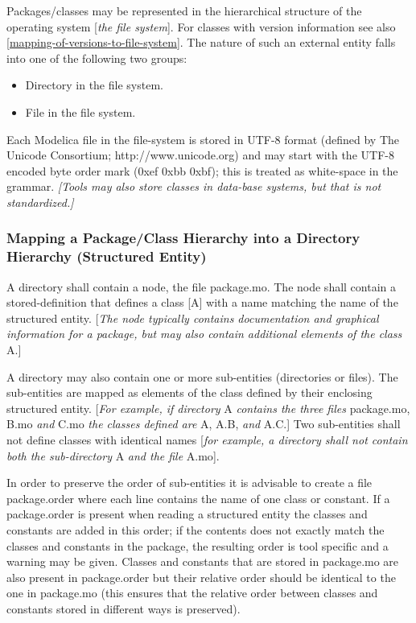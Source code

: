 \documentclass[10pt,a4paper]{report}
\def\doublelabel#1{\label{#1}\hypertarget{#1}{}}
\begin{document}
Packages/classes may be represented in the hierarchical structure of the
operating system {[}\emph{the file system}{]}. For classes with version
information see also \ref{mapping-of-versions-to-file-system}. The nature of such an external
entity falls into one of the following two groups:

\begin{itemize}
\item
  Directory in the file system.
\end{itemize}

\begin{itemize}
\item
  File in the file system.
\end{itemize}

Each Modelica file in the file-system is stored in UTF-8 format (defined
by The Unicode Consortium; http://www.unicode.org) and may start with
the UTF-8 encoded byte order mark (0xef 0xbb 0xbf); this is treated as
white-space in the grammar. \emph{{[}Tools may also store classes in
data-base systems, but that is not standardized.{]}}

\subsubsection{Mapping a Package/Class Hierarchy into a Directory Hierarchy (Structured Entity)}\doublelabel{mapping-a-package-class-hierarchy-into-a-directory-hierarchy-structured-entity}

A directory shall contain a node, the file package.mo. The node shall contain a stored-definition that defines a class {[}A{]} with a name
matching the name of the structured entity. {[}\emph{The node typically
contains documentation and graphical information for a package, but may
also contain additional elements of the class} A.{]}

A directory may also contain one or more sub-entities (directories or
files). The sub-entities are mapped as elements of the class defined by
their enclosing structured entity. {[}\emph{For example, if directory} A
\emph{contains the three files} package.mo, B.mo \emph{and} C.mo
\emph{the classes defined are} A, A.B, \emph{and} A.C.{]} Two
sub-entities shall not define classes with identical names {[}\emph{for
example, a directory shall not contain both the sub-directory} A
\emph{and the file} A.mo{]}.

In order to preserve the order of sub-entities it is advisable to create
a file package.order where each line contains the name of one class or
constant. If a package.order is present when reading a structured entity
the classes and constants are added in this order; if the contents does
not exactly match the classes and constants in the package, the
resulting order is tool specific and a warning may be given. Classes and
constants that are stored in package.mo are also present in
package.order but their relative order should be identical to the one in
package.mo (this ensures that the relative order between classes and
constants stored in different ways is preserved).
\end{document}
